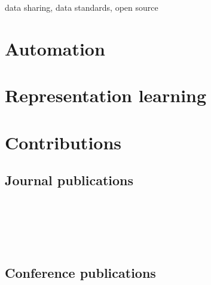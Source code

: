 data sharing, data standards, open source

\section{Automation}

\section{Representation learning}

\section{Contributions}

\subsection*{Journal publications}
 \\ \\
 \\ \\

\subsection*{Conference publications}
 \\ \\
